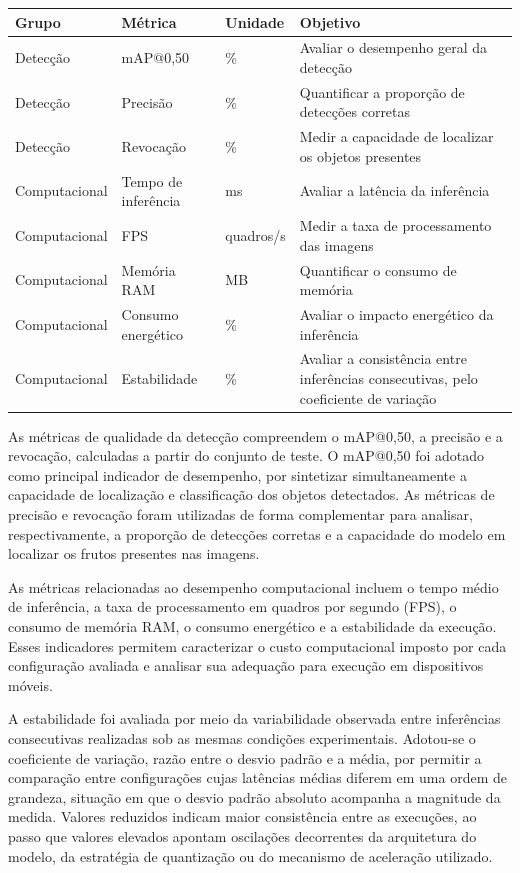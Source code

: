 \documentclass[artigo,times,capa]{iftex2024}
\begin{document}
\begin{board}[H]
\centering
\caption{Métricas utilizadas na avaliação experimental}
\label{quad:metricas_avaliacao}
\small
\begin{tabularx}{\textwidth}{p{2.6cm}p{3.0cm}p{2.2cm}X}
\toprule
\textbf{Grupo} & \textbf{Métrica} & \textbf{Unidade} & \textbf{Objetivo} \\
\midrule
Detecção & \ac{mAP}@0,50 & \% & Avaliar o desempenho geral da detecção \\
Detecção & Precisão & \% & Quantificar a proporção de detecções corretas \\
Detecção & Revocação & \% & Medir a capacidade de localizar os objetos presentes \\
Computacional & Tempo de inferência & ms & Avaliar a latência da inferência \\
Computacional & \ac{FPS} & quadros/s & Medir a taxa de processamento das imagens \\
Computacional & Memória \ac{RAM} & MB & Quantificar o consumo de memória \\
Computacional & Consumo energético & \% & Avaliar o impacto energético da inferência \\
Computacional & Estabilidade & \% & Avaliar a consistência entre inferências consecutivas, pelo coeficiente de variação \\
\bottomrule
\end{tabularx}
\end{board}

As métricas de qualidade da detecção compreendem o \ac{mAP}@0,50, a precisão e a revocação, calculadas a partir do conjunto de teste. O \ac{mAP}@0,50 foi adotado como principal indicador de desempenho, por sintetizar simultaneamente a capacidade de localização e classificação dos objetos detectados. As métricas de precisão e revocação foram utilizadas de forma complementar para analisar, respectivamente, a proporção de detecções corretas e a capacidade do modelo em localizar os frutos presentes nas imagens.

As métricas relacionadas ao desempenho computacional incluem o tempo médio de inferência, a taxa de processamento em quadros por segundo (\ac{FPS}), o consumo de memória \ac{RAM}, o consumo energético e a estabilidade da execução. Esses indicadores permitem caracterizar o custo computacional imposto por cada configuração avaliada e analisar sua adequação para execução em dispositivos móveis.

A estabilidade foi avaliada por meio da variabilidade observada entre inferências consecutivas realizadas sob as mesmas condições experimentais. Adotou-se o coeficiente de variação, razão entre o desvio padrão e a média, por permitir a comparação entre configurações cujas latências médias diferem em uma ordem de grandeza, situação em que o desvio padrão absoluto acompanha a magnitude da medida. Valores reduzidos indicam maior consistência entre as execuções, ao passo que valores elevados apontam oscilações decorrentes da arquitetura do modelo, da estratégia de quantização ou do mecanismo de aceleração utilizado.
\end{document}
